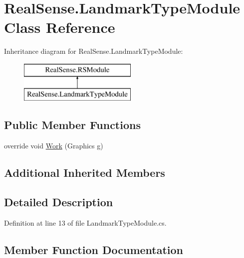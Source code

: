 \hypertarget{class_real_sense_1_1_landmark_type_module}{}\section{Real\+Sense.\+Landmark\+Type\+Module Class Reference}
\label{class_real_sense_1_1_landmark_type_module}
Inheritance diagram for Real\+Sense.\+Landmark\+Type\+Module\+:\begin{figure}[H]
\begin{center}
\leavevmode
\includegraphics[height=2.000000cm]{class_real_sense_1_1_landmark_type_module}
\end{center}
\end{figure}
\subsection*{Public Member Functions}
\begin{DoxyCompactItemize}
\item 
override void \hyperlink{class_real_sense_1_1_landmark_type_module_ad110598b840e5496c1539862c4c53bc7}{Work} (Graphics g)
\end{DoxyCompactItemize}
\subsection*{Additional Inherited Members}


\subsection{Detailed Description}


Definition at line 13 of file Landmark\+Type\+Module.\+cs.



\subsection{Member Function Documentation}
\mbox{\label{class_real_sense_1_1_landmark_type_module_ad110598b840e5496c1539862c4c53bc7}} 
